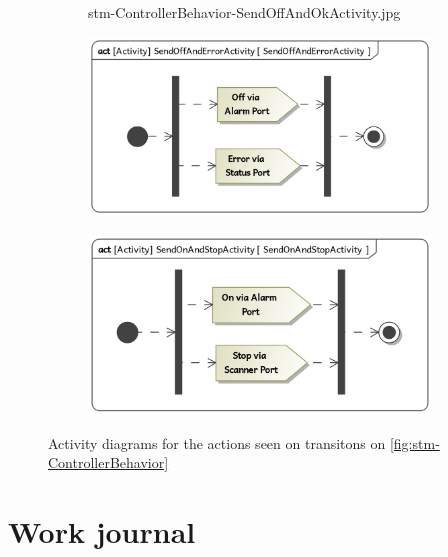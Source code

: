 \documentclass[a4paper]{article}
\begin{document}
\begin{figure}
\begin{subfigure}{.33\textwidth}
		{stm-ControllerBehavior-SendOffAndOkActivity.jpg}
	\end{subfigure}
	\begin{subfigure}{.33\textwidth}
		\includegraphics[width=\textwidth]
		{stm-ControllerBehavior-SendOffAndErrorActivity.jpg}
	\end{subfigure}
	\begin{subfigure}{.33\textwidth}
		\includegraphics[width=\textwidth]
		{stm-ControllerBehavior-SendOnAndStopActivity.jpg}
	\end{subfigure}
	\caption{Activity diagrams for the actions seen on transitons on
		\cref{fig:stm-ControllerBehavior}}%
	\label{fig:stm-ControllerBehavior-actions}
\end{figure}

\section{Work journal}
\end{document}
